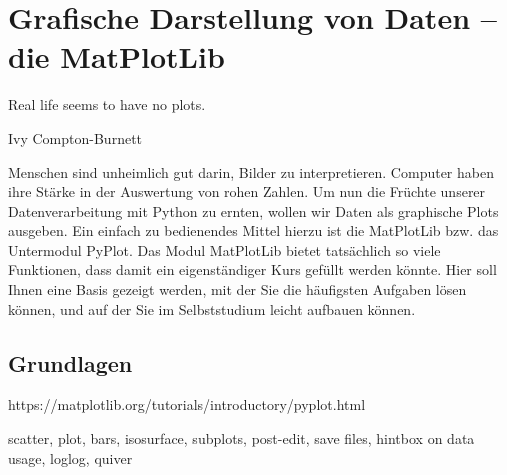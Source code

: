 \chapter{Grafische Darstellung von Daten -- die MatPlotLib}
\label{chp:Matplotlib}
\epigraph{
	Real life seems to have no plots.
}{Ivy Compton-Burnett}

Menschen sind unheimlich gut darin, Bilder zu interpretieren. Computer haben ihre Stärke in der Auswertung von rohen Zahlen. Um nun die Früchte unserer Datenverarbeitung mit Python zu ernten, wollen wir Daten als graphische Plots ausgeben. Ein einfach zu bedienendes Mittel hierzu ist die MatPlotLib bzw. das Untermodul PyPlot. Das Modul MatPlotLib bietet tatsächlich so viele Funktionen, dass damit ein eigenständiger Kurs gefüllt werden könnte. Hier soll Ihnen eine Basis gezeigt werden, mit der Sie die häufigsten Aufgaben lösen können, und auf der Sie im Selbststudium leicht aufbauen können.

\section{Grundlagen}
https://matplotlib.org/tutorials/introductory/pyplot.html




scatter, plot, bars, isosurface, subplots, post-edit, save files, hintbox on data usage, loglog, quiver